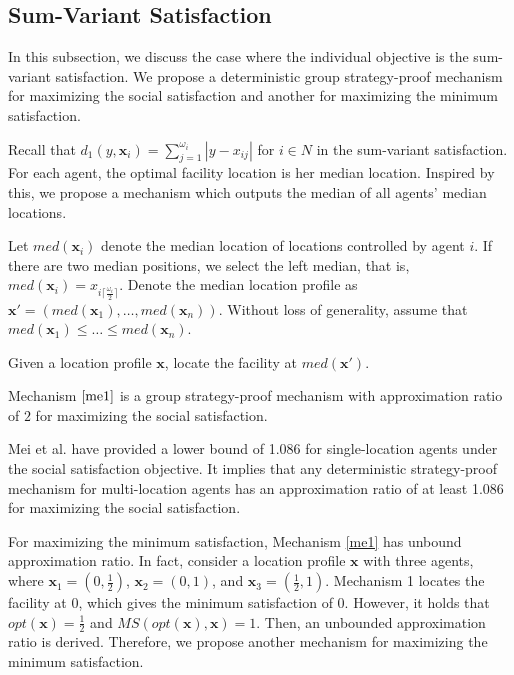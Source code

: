 \documentclass[runningheads]{11llncst}
\begin{document}
\subsection{Sum-Variant Satisfaction}

In this subsection, we discuss the case where the individual objective is  the sum-variant satisfaction. We  propose a deterministic group strategy-proof mechanism  for maximizing the social satisfaction and  another  for maximizing the minimum satisfaction. 

Recall that  $d_1(y,\textbf{x}_i)=\sum_{j=1}^{\omega_i}|y-x_{ij}|$ for $i\in N$ in the sum-variant satisfaction. For each agent, the optimal facility location is  her median location. Inspired by this,  we propose a mechanism which outputs the median of all agents' median locations. 

Let $med(\textbf{x}_i)$ denote the median location of  locations controlled by agent $i$. If there are two median positions, we select the left median, that is, $med(\textbf{x}_i)=x_{i\lceil\frac{\omega_i}{2}\rceil}$. Denote the median location profile as $\textbf{x}'=( med(\textbf{x}_1), \dots,med(\textbf{x}_n))$. Without loss of generality, assume that $med(\textbf{x}_1)\leq \dots\leq med(\textbf{x}_n)$.

\begin{mechanism}\label{me1}
    Given a location profile $\textbf{x}$,  locate the facility at $med(\textbf{x}')$.
\end{mechanism}


\begin{theorem}
     Mechanism $\ref{me1}$ is  a group strategy-proof mechanism with approximation ratio of $2$ for maximizing the social satisfaction.
\end{theorem}

 

Mei et al. \cite{mei2019facility} have provided a lower bound of 1.086 for single-location agents under the social satisfaction objective. It implies that any deterministic strategy-proof mechanism for multi-location agents has an approximation ratio of at least 1.086 for maximizing the social satisfaction. 

For maximizing the minimum  satisfaction, Mechanism \ref{me1} has unbound approximation ratio. In fact, consider a location profile $\textbf{x}$ with three agents, where $\textbf{x}_1=(0,\frac{1}{2})$, $\textbf{x}_2=(0,1)$, and $\textbf{x}_3=(\frac{1}{2},1)$. Mechanism 1 locates the facility at 0, which gives the minimum satisfaction of 0. However, it holds that $opt(\textbf{x})=\frac{1}{2}$ and $MS(opt(\textbf{x}),\textbf{x})=1$. Then,  an unbounded approximation ratio is derived. Therefore, we propose another mechanism for maximizing the minimum  satisfaction.  
\end{document}

